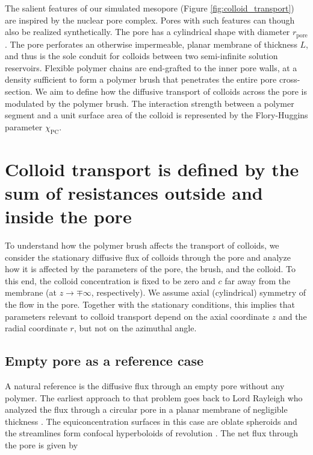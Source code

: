 \documentclass[12pt, a4paper]{article}
\begin{document}
The salient features of our simulated mesopore (Figure \ref{fig:colloid_transport}) are inspired by the nuclear pore complex.
Pores with such features can though also be realized synthetically.
The pore has a cylindrical shape with diameter $r_{\text{pore}}$.
The pore perforates an otherwise impermeable, planar membrane of thickness $L$, and thus is the sole conduit for colloids between two semi-infinite solution reservoirs.
Flexible polymer chains are end-grafted to the inner pore walls, at a density sufficient to form a polymer brush that penetrates the entire pore cross-section.
We aim to define how the diffusive transport of colloids across the pore is modulated by the polymer brush. 
The interaction strength between a polymer segment and a unit surface area of the colloid is represented by the Flory-Huggins parameter $\chi_{\text{PC}}$. 


\section{Colloid transport is defined by the sum of resistances outside and inside the pore}

To understand how the polymer brush affects the transport of colloids, we consider the stationary diffusive flux of colloids through the pore 
and analyze how it is affected by the parameters of the pore, the brush, and the colloid.
To this end, the colloid concentration is fixed to be zero and $c$ far away from the membrane (at $z\rightarrow\mp\infty$, respectively). 
We assume axial (cylindrical) symmetry of the flow in the pore. Together with the stationary conditions, 
this implies that parameters relevant to colloid transport depend on the axial coordinate $z$ and the radial coordinate $r$, but not on the azimuthal angle.

\subsection{Empty pore as a reference case}

A natural reference is the diffusive flux through an empty pore without any polymer. The earliest approach to that problem goes back to Lord Rayleigh 
who analyzed the flux through a circular pore in a planar membrane of negligible thickness \cite{Strutt1878}. 
The equiconcentration surfaces in this case are oblate spheroids and the streamlines form confocal hyperboloids of revolution \cite{Cooke1966}.
The net flux through the pore is given by
\end{document}
